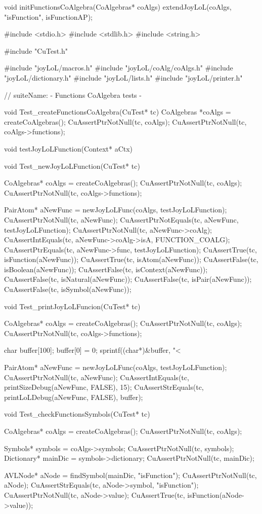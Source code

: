 void initFunctionsCoAlgebra(CoAlgebras* coAlgs) {
  extendJoyLoL(coAlgs, "isFunction", isFunctionAP);
}
\stoptyping

\starttyping
#include <stdio.h>
#include <stdlib.h>
#include <string.h>

#include "CuTest.h"

#include "joyLoL/macros.h"
#include "joyLoL/coAlg/coAlgs.h"
#include "joyLoL/dictionary.h"
#include "joyLoL/lists.h"
#include "joyLoL/printer.h"

// suiteName: - Functions CoAlgebra tests -

void Test_createFunctionsCoAlgebra(CuTest* tc) {
  CoAlgebras *coAlgs = createCoAlgebras();
  CuAssertPtrNotNull(tc, coAlgs);
  CuAssertPtrNotNull(tc, coAlgs->functions);
}

void testJoyLoLFunction(Context* aCtx) { }


void Test_newJoyLoLFunction(CuTest* tc) {
  CoAlgebras* coAlgs = createCoAlgebras();
  CuAssertPtrNotNull(tc, coAlgs);
  CuAssertPtrNotNull(tc, coAlgs->functions);

  PairAtom* aNewFunc = newJoyLoLFunc(coAlgs, testJoyLoLFunction);
  CuAssertPtrNotNull(tc, aNewFunc);
  CuAssertPtrNotEquals(tc, aNewFunc, testJoyLoLFunction);
  CuAssertPtrNotNull(tc, aNewFunc->coAlg);
  CuAssertIntEquals(tc, aNewFunc->coAlg->isA, FUNCTION_COALG);
  CuAssertPtrEquals(tc, aNewFunc->func, testJoyLoLFunction);
  CuAssertTrue(tc, isFunction(aNewFunc));
  CuAssertTrue(tc, isAtom(aNewFunc));
  CuAssertFalse(tc, isBoolean(aNewFunc));
  CuAssertFalse(tc, isContext(aNewFunc));
  CuAssertFalse(tc, isNatural(aNewFunc));
  CuAssertFalse(tc, isPair(aNewFunc));
  CuAssertFalse(tc, isSymbol(aNewFunc));
}

void Test_printJoyLoLFuncion(CuTest* tc) {
  CoAlgebras* coAlgs = createCoAlgebras();
  CuAssertPtrNotNull(tc, coAlgs);
  CuAssertPtrNotNull(tc, coAlgs->functions);

  char buffer[100];
  buffer[0] = 0;
  sprintf((char*)&buffer, "<%

  PairAtom* aNewFunc = newJoyLoLFunc(coAlgs, testJoyLoLFunction);
  CuAssertPtrNotNull(tc, aNewFunc);
  CuAssertIntEquals(tc, printSizeDebug(aNewFunc, FALSE), 15);
  CuAssertStrEquals(tc, printLoLDebug(aNewFunc, FALSE), buffer);
}

void Test_checkFunctionsSymbols(CuTest* tc) {
  CoAlgebras* coAlgs = createCoAlgebras();
  CuAssertPtrNotNull(tc, coAlgs);

  Symbols* symbols = coAlgs->symbols;
  CuAssertPtrNotNull(tc, symbols);
  Dictionary* mainDic = symbols->dictionary;
  CuAssertPtrNotNull(tc, mainDic);

  AVLNode* aNode = findSymbol(mainDic, "isFunction");
  CuAssertPtrNotNull(tc, aNode);
  CuAssertStrEquals(tc, aNode->symbol, "isFunction");
  CuAssertPtrNotNull(tc, aNode->value);
  CuAssertTrue(tc, isFunction(aNode->value));
}

